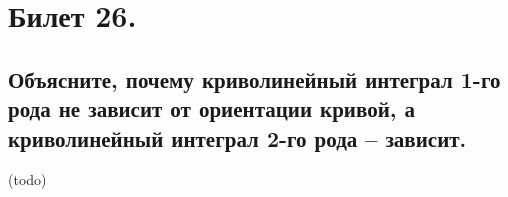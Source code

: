 \section{Билет 26.}

\subsection{Объясните, почему криволинейный интеграл 1-го рода не зависит от ориентации кривой, а криволинейный интеграл 2-го рода -- зависит.}
(todo)